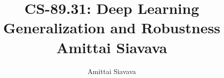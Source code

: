 \documentclass[11pt, reqno]{amsart}
\begin{document}

\title{CS-89.31: Deep Learning Generalization and Robustness\\ Amittai Siavava \\ }
\author{Amittai Siavava}


\setlength{\headheight}{13.0pt}
\setlength{\footskip}{15.0pt}

\maketitle

\bigskip

\def \cram { \textsc{cram} }
\def \dom { \textsc{domineering} }
\def \sub { \textsc{subtraction} }
\def \weighted { \textsc{weighted odds and evens}}
\def \nim { \textsc{nim} }
\def \P { \mathbf{P}}
\def \N { \mathbf{N}}
\end{document}
